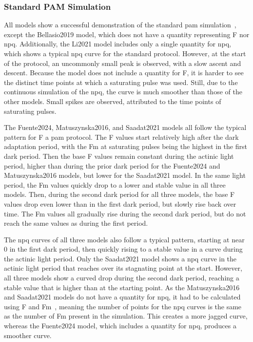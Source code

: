 \subsubsection{Standard PAM Simulation}

All models show a successful demonstration of the standard \gls{pam} simulation~, except the Bellasio2019 model, which does not have a quantity representing \gls{F} nor \gls{npq}. Additionally, the Li2021 model includes only a single quantity for \gls{npq}, which shows a typical \gls{npq} curve for the standard protocol. However, at the start of the protocol, an uncommonly small peak is observed, with a slow ascent and descent. Because the model does not include a quantity for \gls{F}, it is harder to see the distinct time points at which a saturating pulse was used. Still, due to the continuous simulation of the \gls{npq}, the curve is much smoother than those of the other models. Small spikes are observed, attributed to the time points of saturating pulses.

The Fuente2024, Matuszynska2016, and Saadat2021 models all follow the typical pattern for \gls{F} a \gls{pam} protocol. The \gls{F} values start relatively high after the dark adaptation period, with the \gls{Fm} at saturating pulses being the highest in the first dark period. Then the base \gls{F} values remain constant during the actinic light period, higher than during the prior dark period for the Fuente2024 and Matuszynska2016 models, but lower for the Saadat2021 model. In the same light period, the \gls{Fm} values quickly drop to a lower and stable value in all three models. Then, during the second dark period for all three models, the base \gls{F} values drop even lower than in the first dark period, but slowly rise back over time. The \gls{Fm} values all gradually rise during the second dark period, but do not reach the same values as during the first period.

The \gls{npq} curves of all three models also follow a typical pattern, starting at near 0 in the first dark period, then quickly rising to a stable value in a curve during the actinic light period. Only the Saadat2021 model shows a \gls{npq} curve in the actinic light period that reaches over its stagnating point at the start. However, all three models show a curved drop during the second dark period, reaching a stable value that is higher than at the starting point. As the Matuszynska2016 and Saadat2021 models do not have a quantity for \gls{npq}, it had to be calculated using \gls{F} and \gls{Fm}~, meaning the number of points for the \gls{npq} curves is the same as the number of \gls{Fm} present in the simulation. This creates a more jagged curve, whereas the Fuente2024 model, which includes a quantity for \gls{npq}, produces a smoother curve.

